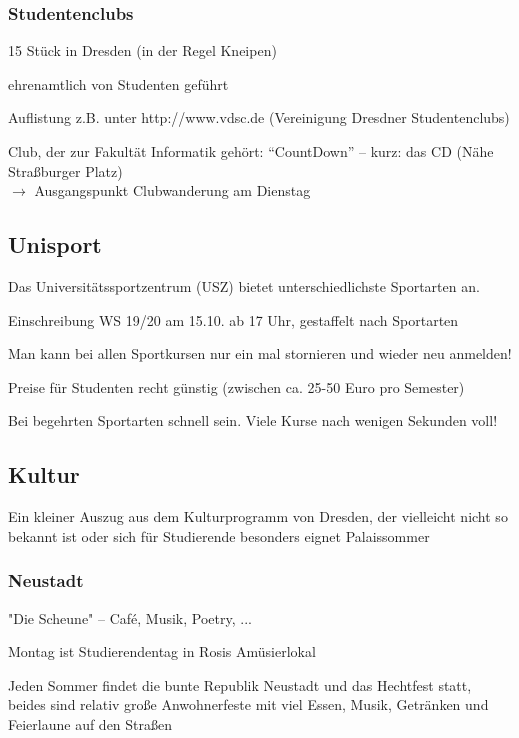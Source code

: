 \documentclass[a4paper,12pt]{report}
\begin{document}
\subsubsection{Studentenclubs}
\begin{itemize*}
	\item 15 Stück in Dresden (in der Regel Kneipen)
	\item ehrenamtlich von Studenten geführt
	\item Auflistung z.B. unter http://www.vdsc.de (Vereinigung Dresdner Studentenclubs)
	\item Club, der zur Fakultät Informatik gehört: \enquote{CountDown} -- kurz: das CD (Nähe Straßburger Platz)\\
	$\rightarrow$ Ausgangspunkt Clubwanderung am Dienstag
\end{itemize*}

\subsection{Unisport}
\begin{itemize*}
	\item Das Universitätssportzentrum (USZ) bietet unterschiedlichste Sportarten an.
	\item Einschreibung WS 19/20 am 15.10. ab 17 Uhr, gestaffelt nach Sportarten
	\item Man kann  bei allen Sportkursen nur ein mal stornieren und wieder neu anmelden! 
	\item Preise für Studenten recht günstig (zwischen ca. 25-50 Euro pro Semester)
	\item Bei begehrten Sportarten schnell sein. Viele Kurse nach wenigen Sekunden voll!
\end{itemize*}

\subsection{Kultur}
Ein kleiner Auszug aus dem Kulturprogramm von Dresden, der vielleicht nicht so bekannt ist oder sich für Studierende besonders eignet
Palaissommer

\subsubsection{Neustadt}
\begin{itemize*}
	\item "Die Scheune" -- Café, Musik, Poetry, ...
	\item Montag ist Studierendentag in Rosis Amüsierlokal
	\item Jeden Sommer findet die bunte Republik Neustadt und das Hechtfest statt, beides sind relativ große Anwohnerfeste mit viel Essen, Musik, Getränken und Feierlaune auf den Straßen
\end{itemize*}
\end{document}
